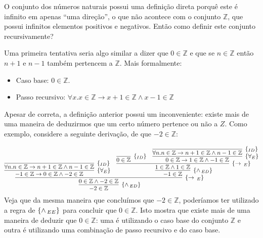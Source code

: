 \begin{Example}
O conjunto dos números naturais possui uma definição direta porquê
este é infinito em apenas ``uma direção'', o que não acontece com o
conjunto $\mathbb{Z}$, que possui infinitos elementos positivos e negativos.
Então como definir este conjunto recursivamente?

Uma primeira tentativa seria algo similar a dizer que $0\in\mathbb{Z}$
e que se $n \in \mathbb{Z}$ então $n + 1$ e $n - 1$ também pertencem a
$\mathbb{Z}$. Mais formalmente:
\begin{itemize}
  \item Caso base: $0\in\mathbb{Z}$.
  \item Passo recursivo: $\forall x. x\in\mathbb{Z} \to x+1 \in
    \mathbb{Z} \land x - 1 \in\mathbb{Z}$
\end{itemize}

Apesar de correta, a definição anterior possui um inconveniente:
existe mais de uma maneira de deduzirmos que um certo número pertence
ou não a $Z$. Como exemplo, considere a seguinte derivação, de que
$-2\in\mathbb{Z}$:

\[
\infer[\andED]{-2\in\mathbb{Z}}
                    {
                      \infer[\impE]{0\in\mathbb{Z}\land -2
                        \in\mathbb{Z}}
                               {
                                 \infer[\forallE]{-1\in\mathbb{Z} \to
                                   0 \in\mathbb{Z} \land -2
                                   \in\mathbb{Z}}
                                   {\infer[\Id]{\forall n.n\in\mathbb{Z}\to n + 1
                                     \in\mathbb{Z}\land n - 1 \in
                                     \mathbb{Z}}{}}
                                    &
                                 \infer[\andED]{-1\in\mathbb{Z}}
                                           {
                                             \infer[\impE]{1\in\mathbb{Z}\land
                                             1\in\mathbb{Z}}
                                               {
                                                 \infer[\Id]{0\in\mathbb{Z}}{}
                                                 &
                                                 \infer[\forallE]{0\in\mathbb{Z}\to
                                                 1 \in\mathbb{Z}\land
                                                 -1\in\mathbb{Z}}{
                                                 \infer[\Id]{\forall
                                               n. n\in\mathbb{Z}\to n
                                               + 1 \in \mathbb{Z}\land
                                             n - 1 \in\mathbb{Z}}{}}
                                               }
                                           }
                               }
                    }
\]
Veja que da mesma maneira que concluímos que $-2\in\mathbb{Z}$,
poderíamos ter utilizado a regra de $\scriptsize{\{\land\,_{EE}\}}$ para concluir que
$0\in\mathbb{Z}$. Isto mostra que existe mais de uma maneira de
deduzir que $0\in\mathbb{Z}$: uma é utilizando o caso base do conjunto
$\mathbb{Z}$ e outra é utilizando uma combinação de passo recursivo e
do caso base.


\end{Example}
